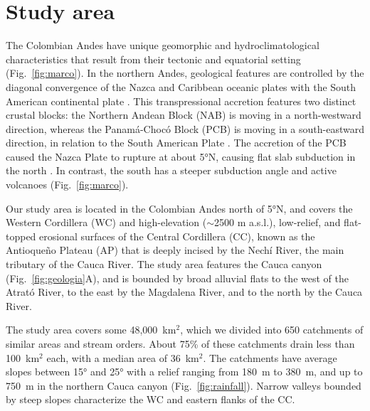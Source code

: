 \documentclass[draft]{agujournal2019}
\begin{document}
\section{Study area}
\par The Colombian Andes have unique geomorphic and hydroclimatological characteristics that result from their tectonic and equatorial setting (Fig.~\ref{fig:marco}). In the northern Andes, geological features are controlled by the diagonal convergence of the Nazca and Caribbean oceanic plates with the South American continental plate \cite{Cediel2003, acosta2007, trenkamp2002}. This transpressional accretion features two distinct crustal blocks: the Northern Andean Block (NAB) is moving in a north-westward direction, whereas the Panamá-Chocó Block (PCB) is moving in a south-eastward direction, in relation to the South American Plate \cite{kellogg1995}. The accretion of the PCB caused the Nazca Plate to rupture at about 5°N, causing flat slab subduction in the north \cite{Taboada2000}. In contrast, the south has a steeper subduction angle and active volcanoes \cite{perez2021, restrepo2019, farris2011, Taboada2000, mann1990} (Fig.~\ref{fig:marco}). 

\par Our study area is located in the Colombian Andes north of 5°N, and covers the Western Cordillera (WC) and high-elevation ($\sim$2500 m a.s.l.), low-relief, and flat-topped erosional surfaces of the Central Cordillera (CC), known as the Antioqueño Plateau (AP) that is deeply incised by the Nechí River, the main tributary of the Cauca River. The study area features the Cauca canyon (Fig.~\ref{fig:geologia}A), and is bounded by broad alluvial flats to the west of the Atrató River, to the east by the Magdalena River, and to the north by the Cauca River.

\par The study area covers some 48,000~km$^2$, which we divided into 650 catchments of similar areas and stream orders. About 75\% of these catchments drain less than 100~km$^{2}$ each, with a median area of 36~km$^{2}$. The catchments have average slopes between 15° and 25° with a relief ranging from 180~m to 380~m, and up to 750~m in the northern Cauca canyon (Fig.~\ref{fig:rainfall}). Narrow valleys bounded by steep slopes characterize the WC and eastern flanks of the CC. 
\end{document}
